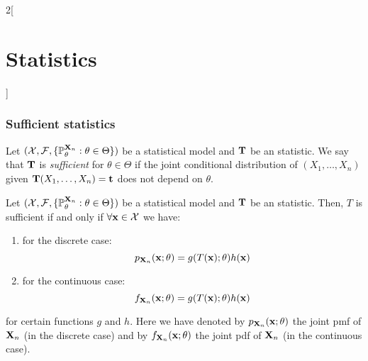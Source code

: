 \documentclass[../../../main.tex]{subfiles}
\begin{document}
\begin{multicols}{2}[\section{Statistics}]
  \subsubsection{Sufficient statistics}
  \begin{definition}
    Let $(\mathcal{X},\mathcal{F},\{\mathbb{P}_\theta^{\boldsymbol{\mathrm{X}}_n}:\theta\in\Theta\})$ be a statistical model and $\boldsymbol{\mathrm{T}}$ be an statistic. We say that $\boldsymbol{\mathrm{T}}$ is \emph{sufficient} for $\theta\in\Theta$ if the joint conditional distribution of $(X_1,\ldots,X_n)$ given $\boldsymbol{\mathrm{T}}(X_1,\ldots,X_n)=\boldsymbol{\mathrm{t}}$ does not depend on $\theta$.
  \end{definition}
  \begin{theorem}
    Let $(\mathcal{X},\mathcal{F},\{\mathbb{P}_\theta^{\boldsymbol{\mathrm{X}}_n}:\theta\in\Theta\})$ be a statistical model and $\boldsymbol{\mathrm{T}}$ be an statistic. Then, $T$ is sufficient if and only if $\forall \boldsymbol{\mathrm{x}}\in\mathcal{X}$ we have:
    \begin{enumerate}
      \item for the discrete case: $$p_{\boldsymbol{\mathrm{X}}_n}(\boldsymbol{\mathrm{x}};\theta)=g(T(\boldsymbol{\mathrm{x}});\theta)h(\boldsymbol{\mathrm{x}})$$
      \item for the continuous case:  $$f_{\boldsymbol{\mathrm{X}}_n}(\boldsymbol{\mathrm{x}};\theta)=g(T(\boldsymbol{\mathrm{x}});\theta)h(\boldsymbol{\mathrm{x}})$$
    \end{enumerate}
    for certain functions $g$ and $h$. Here we have denoted by $p_{\boldsymbol{\mathrm{X}}_n}(\boldsymbol{\mathrm{x}};\theta)$ the joint pmf of $\boldsymbol{\mathrm{X}}_n$ (in the discrete case) and by $f_{\boldsymbol{\mathrm{X}}_n}(\boldsymbol{\mathrm{x}};\theta)$ the joint pdf of $\boldsymbol{\mathrm{X}}_n$ (in the continuous case).
  \end{theorem}

\end{multicols}
\end{document}

